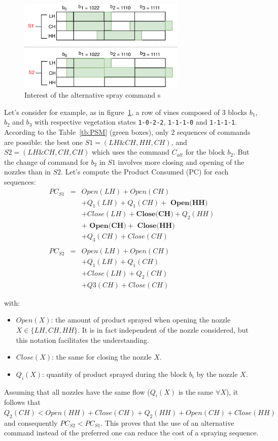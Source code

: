 \documentclass[preprint,3p,times,twocolumn]{elsarticle}
\begin{document}
\begin{figure}[h!]
\begin{center}
	\includegraphics[width=8cm]{Explication.pdf}
	\caption{Interest of the alternative spray command s} 
	\label{fig:CbestCalt}
\end{center}
\end{figure}

Let's consider for example, as in figure~\ref{fig:CbestCalt}, a row of vines composed of 3 blocks $ b_1 $, $ b_2 $ and $ b_3 $ with respective vegetation states \texttt{1-0-2-2}, \texttt{1-1-1-0} and \texttt{1-1-1-1}. According to the Table~\ref{tb:PSM} (green boxes), only 2 sequences of commands are possible: the best one $ S1= (LH \& CH, HH, CH) $, and $ S2=(LH \& CH, CH, CH)$ which uses the command $C_{alt}$ for the block $b_2$. 
But the change of command for $ b_2 $ in $S1$ involves more closing and opening of the nozzles than in $ S2 $. Let's compute the Product Consumed (PC) for each sequences:
\begin{eqnarray*}
PC_{S1} & = & Open(LH) + Open(CH) \\
&   & + Q_1(LH) + Q_1(CH) +\textbf{ Open(HH)} \\
&   & + Close(LH) + \textbf{Close(CH)} +  Q_2(HH) \\
&   &+\textbf{ Open(CH)} + \textbf{ Close(HH)}\\
&   & + Q_3(CH) + Close(CH) \\
& & \\
PC_{S2} & = & Open(LH) + Open(CH) \\
&   & + Q_1(LH) + Q_1(CH) \\
&   & + Close(LH) +  Q_2(CH) \\
&   & + Q3(CH) + Close(CH)
\end{eqnarray*}

with:
\begin{itemize}
\item $ Open (X) $: the amount of product sprayed when opening the nozzle $ X \in \{LH,CH,HH\}$. It is in fact independent of the nozzle considered, but this notation facilitates the understanding. 
\item $ Close (X) $: the same for closing the nozzle $ X $.
\item $ Q_i (X) $: quantity of product sprayed during the block $ b_i $ by the nozzle $ X $.
\end{itemize}
Assuming that all nozzles have the same flow ($Q_i(X)$ is the same $ \forall X$), it follows that $ Q_2(CH) < Open(HH) + Close(CH) + Q_2(HH) + Open(CH) + Close(HH) $ and consequently $PC_{S2}<PC_{S1}$. This proves that the use of an alternative command instead of the preferred one can reduce the cost of a spraying sequence.
\end{document}
